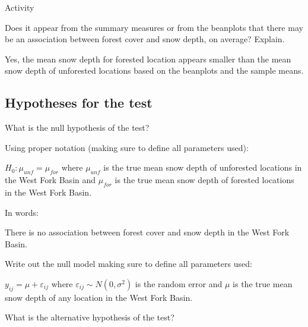 \documentclass[12pt]{article}\usepackage[]{graphicx}\usepackage[]{color}
\begin{document}
\begin{exam}{Activity}

\begin{problem}
Does it appear from the summary measures or from the beanplots that there may be an association between forest cover and snow depth, on average? Explain.

\begin{solution}[2cm]
Yes, the mean snow depth for forested location appears smaller than the mean snow depth of unforested locations based on the beanplots and the sample means.
\end{solution}
\end{problem}

\subsection*{Hypotheses for the test}

\begin{problem*}
What is the null hypothesis of the test?

\begin{parts}
\item Using proper notation (making sure to define all parameters used):
\begin{solution}[2cm]
$H_0: \mu_{unf} = \mu_{for}$ where $\mu_{unf}$ is the true mean snow depth of unforested locations in the West Fork Basin and $\mu_{for}$ is the true mean snow depth of forested locations in the West Fork Basin.
\end{solution}
  \item In words:
  \begin{solution}[2cm]
There is no association between forest cover and snow depth in the West Fork Basin.
\end{solution}
  \item Write out the null model making sure to define all parameters used:
  \begin{solution}[2cm]
$y_{ij} = \mu + \varepsilon_{ij}$ where $\varepsilon_{ij} \sim{} N(0,\sigma^2)$ is the random error and $\mu$ is the true mean snow depth of any location in the West Fork Basin.
\end{solution}
\end{parts}
\end{problem*}


\begin{problem*}
What is the alternative hypothesis of the test?


\end{problem*}
\end{exam}
\end{document}
